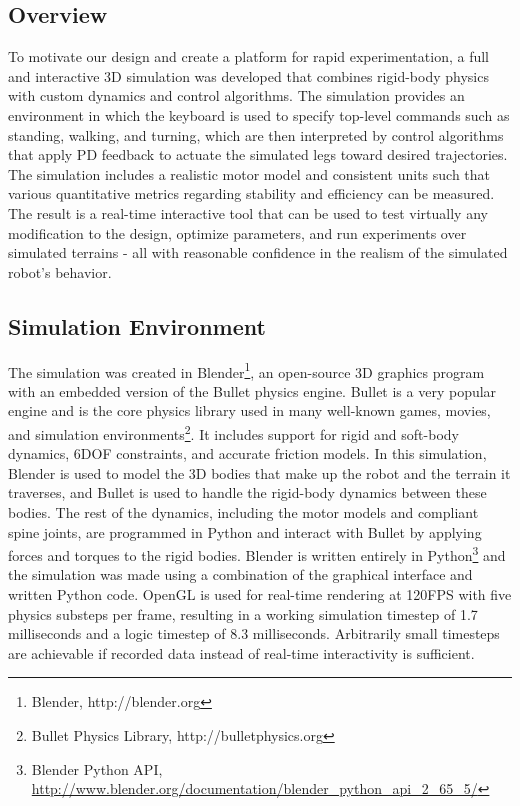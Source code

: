 \documentclass[11pt]{article}
\begin{document}
\subsection{Overview}

To motivate our design and create a platform for rapid experimentation, a full and interactive 3D simulation was developed that combines rigid-body physics with custom dynamics and control algorithms. The simulation provides an environment in which the keyboard is used to specify top-level commands such as standing, walking, and turning, which are then interpreted by control algorithms that apply PD feedback to actuate the simulated legs toward desired trajectories. The simulation includes a realistic motor model and consistent units such that various quantitative metrics regarding stability and efficiency can be measured. The result is a real-time interactive tool that can be used to test virtually any modification to the design, optimize parameters, and run experiments over simulated terrains - all with reasonable confidence in the realism of the simulated robot's behavior.
 
\subsection{Simulation Environment}

The simulation was created in Blender\footnote{Blender, http://blender.org}, an open-source 3D graphics program with an embedded version of the Bullet physics engine. Bullet is a very popular engine and is the core physics library used in many well-known games, movies, and simulation environments\footnote{Bullet Physics Library, http://bulletphysics.org}. It includes support for rigid and soft-body dynamics, 6DOF constraints, and accurate friction models. In this simulation, Blender is used to model the 3D bodies that make up the robot and the terrain it traverses, and Bullet is used to handle the rigid-body dynamics between these bodies. The rest of the dynamics, including the motor models and compliant spine joints, are programmed in Python and interact with Bullet by applying forces and torques to the rigid bodies. Blender is written entirely in Python\footnote{Blender Python API, \url{http://www.blender.org/documentation/blender_python_api_2_65_5/}} and the simulation was made using a combination of the graphical interface and written Python code. OpenGL is used for real-time rendering at 120FPS with five physics substeps per frame, resulting in a working simulation timestep of 1.7 milliseconds and a logic timestep of 8.3 milliseconds. Arbitrarily small timesteps are achievable if recorded data instead of real-time interactivity is sufficient.
\end{document}
